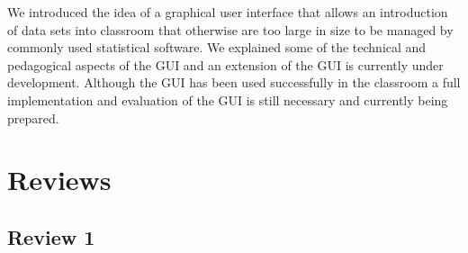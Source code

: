 \documentclass[11pt]{tise_style}
\begin{document}
We introduced the idea of a graphical user interface that allows an introduction of data sets into classroom that otherwise are too large in size to be managed by commonly used statistical software. We explained some of the technical and pedagogical aspects of the GUI and an extension of the GUI is currently under development. Although the GUI has been used successfully in the classroom a full implementation and evaluation of the GUI is still necessary and currently being prepared.

\section{{Reviews}}

\subsection{{Review 1}}
\end{document}
